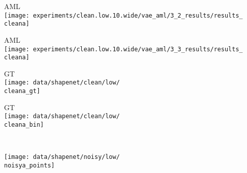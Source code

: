 \begin{minipage}[t]{0.1\textwidth}
    \vspace{0px}\centering
    \small AML\\
    \texttt{[image: experiments/clean.low.10.wide/vae\_aml/3\_2\_results/results\_\\cleana]}
\end{minipage}
\begin{minipage}[t]{0.1\textwidth}
    \vspace{0px}\centering
    \small AML\\
    \texttt{[image: experiments/clean.low.10.wide/vae\_aml/3\_3\_results/results\_\\cleana]}
\end{minipage}
\begin{minipage}[t]{0.1\textwidth}
    \vspace{0px}\centering
    \small GT\\
    \texttt{[image: data/shapenet/clean/low/\\cleana\_gt]}
\end{minipage}
\begin{minipage}[t]{0.1\textwidth}
    \vspace{0px}\centering
    \small GT\\
    \texttt{[image: data/shapenet/clean/low/\\cleana\_bin]}
\end{minipage}
\\
\begin{minipage}[t]{0.02\textwidth}
    \vspace{0px}\centering
\end{minipage}
\begin{minipage}[t]{0.1\textwidth}
    \vspace{0px}\centering
    \texttt{[image: data/shapenet/noisy/low/\\noisya\_points]}
\end{minipage}
